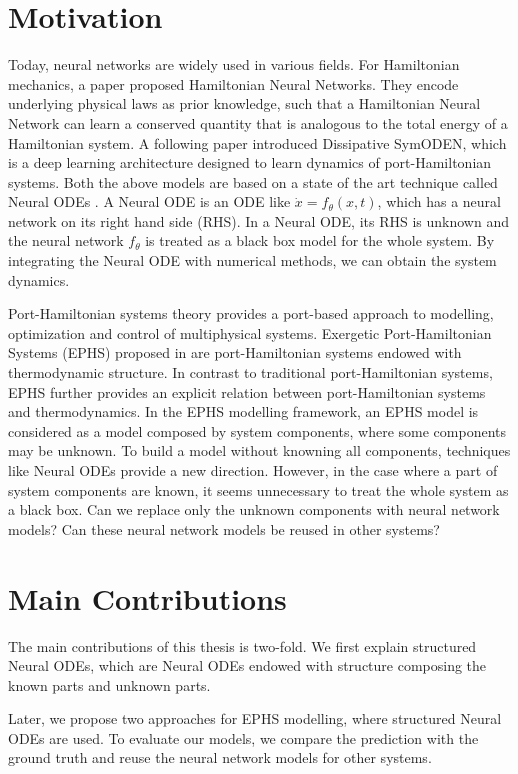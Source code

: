 \documentclass[
	parskip, 			   %
	twoside, 			   %
	DIV=14, 			   %
	BCOR=15.0mm, 		   %
	headsepline, 		   %
	open=right, 		   %
	captions=tableheading, %
	bibliography=totoc,    %
	numbers=noenddot       %
]{scrreprt}
\begin{document}
\section{Motivation}
Today, neural networks are widely used in various fields. For Hamiltonian mechanics, a paper \cite{greydanus2019hamiltonian} proposed Hamiltonian Neural Networks. They encode underlying physical laws as prior knowledge, such that a Hamiltonian Neural Network can learn a conserved quantity that is analogous to the total energy of a Hamiltonian system. A following paper \cite{zhong2020dissipative} introduced Dissipative SymODEN, which is a deep learning architecture designed to learn dynamics of port-Hamiltonian systems. Both the above models are based on a state of the art technique called Neural ODEs \cite{chen2018neural}. A Neural ODE is an ODE like $\dot{x} = f_{\theta}(x, t)$, which has a neural network on its right hand side (RHS). In a Neural ODE, its RHS is unknown and the neural network $f_{\theta}$ is treated as a black box model for the whole system. By integrating the Neural ODE with numerical methods, we can obtain the system dynamics.

Port-Hamiltonian systems theory provides a port-based approach to modelling, optimization and control of multiphysical systems. Exergetic Port-Hamiltonian Systems (EPHS) proposed in \cite{lohmayer2021exergetic} are port-Hamiltonian systems endowed with thermodynamic structure. In contrast to traditional port-Hamiltonian systems, EPHS further provides an explicit relation between port-Hamiltonian systems and thermodynamics. In the EPHS modelling framework, an EPHS model is considered as a model composed by system components, where some components may be unknown. To build a model without knowning all components, techniques like Neural ODEs provide a new direction. However, in the case where a part of system components are known, it seems unnecessary to treat the whole system as a black box. Can we replace only the unknown components with neural network models? Can these neural network models be reused in other systems?

\section{Main Contributions}
The main contributions of this thesis is two-fold. We first explain structured Neural ODEs, which are Neural ODEs endowed with structure composing the known parts and unknown parts. 

Later, we propose two approaches for EPHS modelling, where structured Neural ODEs are used. To evaluate our models, we compare the prediction with the ground truth and reuse the neural network models for other systems.
\end{document}

